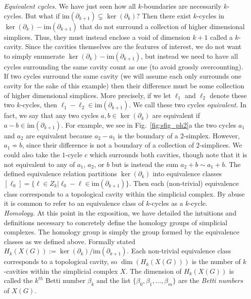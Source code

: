 \documentclass{article}
\begin{document}
\noindent\emph{Equivalent cycles.} We have just seen how all $k$-boundaries are necessarily $k$-cycles. But what if $\text{im}(\partial_{k+1}) \subsetneq \ker(\partial_k)$? Then there exist $k$-cycles in $\ker(\partial_k) - \text{im}(\partial_{k+1})$ that do not surround a collection of higher dimensional simplices. Thus, they must instead enclose a void of dimension $k+1$ called a $k$-cavity. Since the cavities themselves are the features of interest, we do not want to simply enumerate $\ker(\partial_k) - \text{im}(\partial_{k+1})$, but instead we need to have all cycles surrounding the same cavity count as one (to avoid grossly overcounting). If two cycles surround the same cavity (we will assume each only surrounds one cavity for the sake of this example) then their difference must be some collection of higher dimensional simplices. More precisely, if we let $\ell_1$ and $\ell_2$ denote these two $k$-cycles, then $\ell_1 - \ell_2 \in \text{im}(\partial_{k+1})$. We call these two cycles \emph{equivalent}. In fact, we say that any two cycles $a,b \in \ker(\partial_k)$ are equivalent if $a-b \in \text{im}(\partial_{k+1})$. For example, we see in Fig.~\ref{fig:sfig_ph2}a the two cycles $a_1$ and $a_2$ are equivalent because $a_2 - a_1$ is the boundary of a $2$-simplex. However, $a_1 \not\sim b$, since their difference is not a boundary of a collection of 2-simplices. We could also take the $1$-cycle $c$ which surrounds both cavities, though note that it is not equivalent to any of $a_1$, $a_2$, or $b$ but is instead the sum $a_2 + b \sim a_1+b$. The defined equivalence relation partitions $\ker(\partial_k)$ into equivalence classes $[\ell_0] = \{\ell \in Z_k | \ell_0 - \ell \in \text{im}(\partial_{k+1})\}$. Then each (non-trivial) equivalence class corresponds to a topological cavity within the simplicial complex. By abuse it is common to refer to an equivalence class of $k$-cycles as a $k$-cycle.\\

\noindent\emph{Homology.} At this point in the exposition, we have detailed the intuitions and definitions necessary to concretely define the homology groups of simplicial complexes. The homology group is simply the group formed by the equivalence classes as we defined above. Formally stated $H_k(X(G)) := \ker(\partial_k)/\text{im}(\partial_{k+1})$. Each non-trivial equivalence class corresponds to a topological cavity, so $\dim(H_k(X(G)))$ is the number of $k$-cavities within the simplicial complex $X$. The dimension of $H_k(X(G))$ is called the $k^{th}$ Betti number $\beta_k$ and the list $\{\beta_0, \beta_1, \dots, \beta_m\}$ are the \emph{Betti numbers} of $X(G)$.\\
\end{document}
